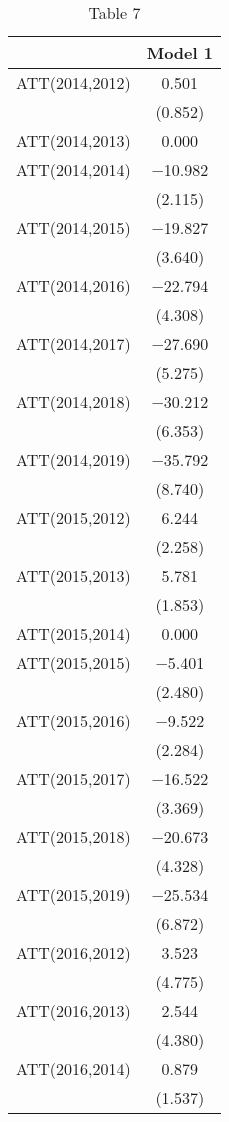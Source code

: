\begin{table}

\caption{\label{tab:unnamed-chunk-1}Table 7}
\centering
\begin{tabular}[t]{lc}
\toprule
  & Model 1\\
\midrule
ATT(2014,2012) & \num{0.501}\\
 & (\num{0.852})\\
ATT(2014,2013) & \num{0.000}\\
ATT(2014,2014) & \num{-10.982}\\
 & (\num{2.115})\\
ATT(2014,2015) & \num{-19.827}\\
 & (\num{3.640})\\
ATT(2014,2016) & \num{-22.794}\\
 & (\num{4.308})\\
ATT(2014,2017) & \num{-27.690}\\
 & (\num{5.275})\\
ATT(2014,2018) & \num{-30.212}\\
 & (\num{6.353})\\
ATT(2014,2019) & \num{-35.792}\\
 & (\num{8.740})\\
ATT(2015,2012) & \num{6.244}\\
 & (\num{2.258})\\
ATT(2015,2013) & \num{5.781}\\
 & (\num{1.853})\\
ATT(2015,2014) & \num{0.000}\\
ATT(2015,2015) & \num{-5.401}\\
 & (\num{2.480})\\
ATT(2015,2016) & \num{-9.522}\\
 & (\num{2.284})\\
ATT(2015,2017) & \num{-16.522}\\
 & (\num{3.369})\\
ATT(2015,2018) & \num{-20.673}\\
 & (\num{4.328})\\
ATT(2015,2019) & \num{-25.534}\\
 & (\num{6.872})\\
ATT(2016,2012) & \num{3.523}\\
 & (\num{4.775})\\
ATT(2016,2013) & \num{2.544}\\
 & (\num{4.380})\\
ATT(2016,2014) & \num{0.879}\\
 & (\num{1.537})\\

\end{tabular}
\end{table}
